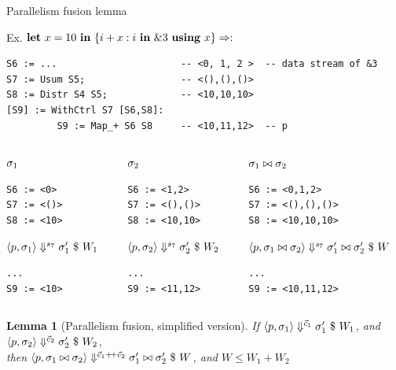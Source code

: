 \documentclass{beamer}
\newtheorem{lem}[thm]{Lemma}
\begin{document}
\begin{frame}[fragile,shrink=20]{Parallelism fusion lemma}

Ex. $\mathbf{let} \ x = 10 \ \mathbf{in} \ \{i+x : i \ \mathbf{in} \ \&3 \ \mathbf{using} \ x\} \Rightarrow :$  

\begin{lstlisting}[style=svcode-style]
S6 := ...                      -- <0, 1, 2 >  -- data stream of &3         
S7 := Usum S5;                 -- <(),(),()>
S8 := Distr S4 S5;             -- <10,10,10>
[S9] := WithCtrl S7 [S6,S8]:
         S9 := Map_+ S6 S8     -- <10,11,12>  -- p
\end{lstlisting}

\begin{columns}
\pause
\begin{column}{0.25\textwidth}
	$\sigma_1$ 
	\begin{lstlisting}[style=svcode-style]
S6 := <0> 
S7 := <()>
S8 := <10>
\end{lstlisting}
$\left\langle p,\sigma_1 \right\rangle \Downarrow^{s_7} \sigma_1' \ \$ \ W_1$
\begin{lstlisting}[style=svcode-style]
...
S9 := <10>
\end{lstlisting}

\end{column}
\pause 
\begin{column}{0.25\textwidth}
	$\sigma_2$ 
\begin{lstlisting}[style=svcode-style]
S6 := <1,2> 
S7 := <(),()>
S8 := <10,10>
\end{lstlisting}

$\left\langle p,\sigma_2 \right\rangle \Downarrow^{s_7} \sigma_2' \ \$ \ W_2$
\begin{lstlisting}[style=svcode-style]
...
S9 := <11,12>
\end{lstlisting}
\end{column}

\pause	
\begin{column}{0.4\textwidth}
	$\sigma_1 \stackrel{}{\bowtie}  \sigma_2$ 
\begin{lstlisting}[style=svcode-style]
S6 := <0,1,2> 
S7 := <(),(),()>
S8 := <10,10,10>
\end{lstlisting}

$\left\langle p,\sigma_1 \stackrel{}{\bowtie} \sigma_2 \right\rangle \Downarrow^{\mathit{s}_7}  \sigma_1' \stackrel{}{\bowtie} \sigma_2'  \ \$ \ W$ 
\begin{lstlisting}[style=svcode-style]
...
S9 := <10,11,12>
\end{lstlisting}	
	
\end{column}
\end{columns}

\pause
\begin{lem}[Parallelism fusion, simplified version]
If $\left\langle p,\sigma_1 \right\rangle \Downarrow^{\vec c_1} \sigma_1' \ \$ \ W_1$, and $\left\langle p,\sigma_2 \right\rangle \Downarrow^{\vec c_2} \sigma_2' \ \$ \ W_2$, \\
then $\seval{p}{\sgm_1 \x{} \sgm_2}{\c_1 {\++} \c_2}{ \sgm_1' \x{} \sgm_2' }{W}$, and $W \le W_1 + W_2$
\end{lem}





\end{frame}
\end{document}
